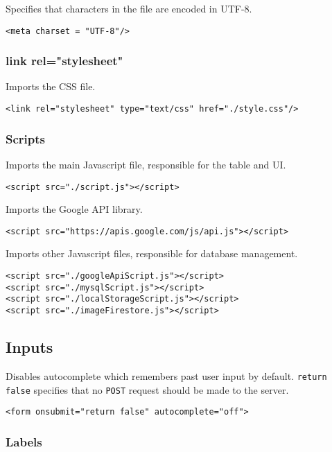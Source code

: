 \documentclass[letterpaper]{article}
\begin{document}
Specifies that characters in the file are encoded in UTF-8.
\begin{lstlisting}[firstnumber=4]
<meta charset = "UTF-8"/>
\end{lstlisting}

\subsubsection{link rel="stylesheet"}

Imports the CSS file.
\begin{lstlisting}[firstnumber=5]
<link rel="stylesheet" type="text/css" href="./style.css"/>
\end{lstlisting}

\subsubsection{Scripts}

Imports the main Javascript file, responsible for the table and UI.
\begin{lstlisting}[firstnumber=7]
<script src="./script.js"></script>
\end{lstlisting}

Imports the Google API library.
\begin{lstlisting}[firstnumber=8]
<script src="https://apis.google.com/js/api.js"></script>
\end{lstlisting}

Imports other Javascript files, responsible for database management.
\begin{lstlisting}[firstnumber=9]
<script src="./googleApiScript.js"></script>
<script src="./mysqlScript.js"></script>
<script src="./localStorageScript.js"></script>
<script src="./imageFirestore.js"></script>
\end{lstlisting}

\subsection{Inputs}

Disables autocomplete which remembers past user input by default. \lstinline{return false} specifies that no \lstinline{POST} request should be made to the server.
\begin{lstlisting}[firstnumber=20]
<form onsubmit="return false" autocomplete="off">
\end{lstlisting}

\subsubsection{Labels}
\end{document}
